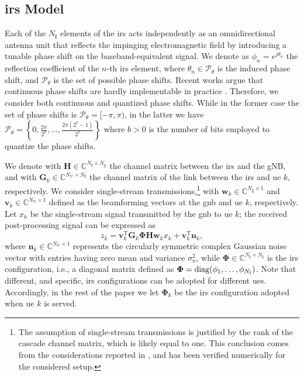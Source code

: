 \subsection{\gls{irs} Model}\label{sec:irsmodel}
Each of the $N_{\mathrm I}$ elements of the \gls{irs} acts independently as an omnidirectional antenna unit that reflects the impinging electromagnetic field by introducing a tunable phase shift on the baseband-equivalent signal. We denote as $\phi_n=e^{j\theta_n}$ the reflection coefficient of the $n$-th \gls{irs} element, where $\theta_n \in \mathcal{P}_{\theta}$ is the induced phase shift, and $\mathcal{P}_{\theta}$ is the set of possible phase shifts. 
Recent works argue that continuous phase shifts are hardly implementable in practice \cite{Tan2018}. Therefore, we consider both continuous and quantized phase shifts. While in the former case the set of phase shifts is $\mathcal{P}_{\theta}= [-\pi, \pi)$, in the latter we have 
$\mathcal{P}_{\theta} = \left\{0, \frac{2\pi}{2^b},\ldots,\frac{2\pi(2^b-1)}{2^b} \right\}$ where $b>0$ is the number of bits employed to quantize the phase shifts. 

We denote with $\bm{H} \in \mathbb{C}^{N_{\mathrm I} \times N_{\mathrm g}}$ the channel matrix between the \gls{irs} and the gNB, and with $\bm{G}_k \in \mathbb{C}^{N_{\mathrm U} \times N_{\mathrm I}}$ the channel matrix of the link between the \gls{irs} and \gls{ue} $k$, respectively.
We consider single-stream transmissions,\footnote{The assumption of single-stream transmissions is justified by the rank of the cascade channel matrix, which is likely equal to one. This conclusion comes from the considerations reported in \cite{he2020cascaded, rains2023ris,rappaport2017investigation}, and has been verified numerically for the considered setup.} with $\bm{w}_k \in \mathbb{C}^{N_{\mathrm g}\times 1}$ and $\bm{v}_k\in \mathbb{C}^{N_{\mathrm U}\times 1}$ defined as the beamforming vectors at the \gls{gnb} and \gls{ue} $k$, respectively.
Let $x_k$ be the single-stream signal transmitted by the \gls{gnb} to \gls{ue} $k$; the received post-processing signal can be expressed as
\begin{equation}
    z_k = \bm{v}_k^{\mathrm T} \bm{G}_k \bm{\Phi} \bm{H}  \bm{w}_kx_k + \bm{v}_k^{\mathrm T} \bm{n}_{k},
\end{equation}
where $\bm{n}_k\in \mathbb{C}^{N_{\mathrm U}\times 1}$ represents the circularly symmetric complex Gaussian noise vector with entries having zero mean and variance $\sigma^2_{n}$, while $\bm{\Phi} \in \mathbb{C}^{N_{\mathrm I}\times N_{\mathrm I}}$ is the {\gls{irs} configuration}, i.e., a diagonal matrix defined as $\bm{\Phi} = \operatorname*{diag}(\phi_1,\ldots,\phi_{N_{\mathrm I}})$.
Note that different, and specific, \gls{irs} configurations can be adopted for different \glspl{ue}. Accordingly, in the rest of the paper we let $\bm{\Phi}_k$ be the \gls{irs} configuration adopted when \gls{ue} $k$ is served.

